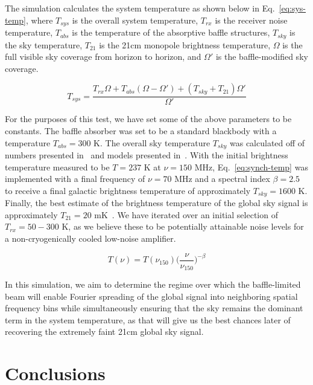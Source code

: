 \documentclass[11pt]{article}
\begin{document}
The simulation calculates the system temperature as shown below in 
Eq.~\eqref{eq:sys-temp}, where $T_{sys}$ is the overall system temperature, 
$T_{rx}$ is the receiver noise temperature, $T_{abs}$ is the temperature of the 
absorptive baffle structures, $T_{sky}$ is the sky temperature, $T_{21}$ is the 
21cm monopole brightness temperature, $\Omega$ is the full visible sky coverage 
from horizon to horizon, and $\Omega'$ is the baffle-modified sky coverage.

\begin{equation}
    \label{eq:sys-temp}
    T_{sys} = \frac{T_{rx} \Omega + T_{abs} (\Omega - \Omega') + (T_{sky} + 
    T_{21}) \Omega'}{\Omega'}
\end{equation}

For the purposes of this test, we have set some of the above parameters to be 
constants. The baffle absorber was set to be a standard blackbody with a 
temperature $T_{abs} = 300$ K. The overall sky temperature $T_{sky}$ was 
calculated off of numbers presented in~\cite{rogers2008} and models presented 
in~\cite{haslam1982}.  With the initial brightness temperature measured to be 
$T = 237$ K at $\nu = 150$ MHz, Eq.~\eqref{eq:synch-temp} was implemented with 
a final frequency of $\nu = 70$ MHz and a spectral index $\beta = 2.5$ to 
receive a final galactic brightness temperature of approximately $T_{sky} = 
1600$ K.  Finally, the best estimate of the brightness temperature of the 
global sky signal is approximately $T_{21} = 20$ mK~\citep{pritchard-loeb2010}.  
We have iterated over an initial selection of $T_{rx} = 50 - 300$ K, as we 
believe these to be potentially attainable noise levels for a non-cryogenically 
cooled low-noise amplifier. 

\begin{equation}
    \label{eq:synch-temp}
    T(\nu) = T(\nu_{150}) \Big(\frac{\nu}{\nu_{150}} \Big)^{-\beta}
\end{equation}

In this simulation, we aim to determine the regime over which the 
baffle-limited beam will enable Fourier spreading of the global signal into 
neighboring spatial frequency bins while simultaneously ensuring that the sky 
remains the dominant term in the system temperature, as that will give us the 
best chances later of recovering the extremely faint 21cm global sky signal.

\section{Conclusions}
\end{document}
